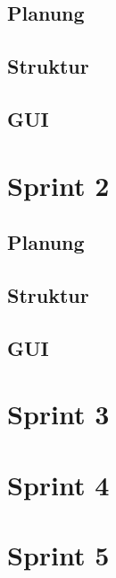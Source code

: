 \documentclass{my_Presentation}
\begin{document}
\subsection*{Planung}

\subsection*{Struktur}

\subsection*{GUI}



\section{Sprint 2}
\subsection*{Planung}

\subsection*{Struktur}

\subsection*{GUI}



\section{Sprint 3}





\section{Sprint 4}




\section{Sprint 5}

%
\end{document}
